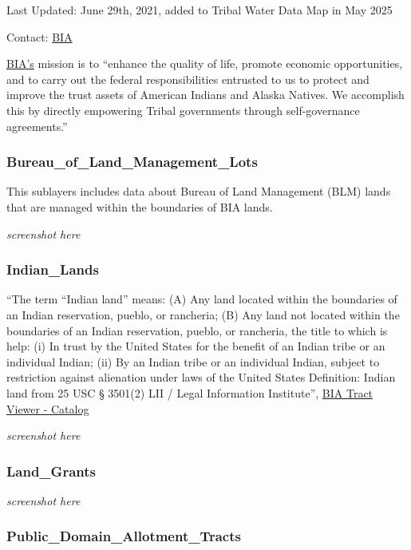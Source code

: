 \documentclass[
  letterpaper,
  DIV=11,
  numbers=noendperiod]{scrreprt}
\begin{document}
Last Updated: June 29th, 2021, added to Tribal Water Data Map in May
2025

Contact: \href{https://www.bia.gov/bia}{BIA}

\href{https://www.bia.gov/bia}{BIA's} mission is to ``enhance the
quality of life, promote economic opportunities, and to carry out the
federal responsibilities entrusted to us to protect and improve the
trust assets of American Indians and Alaska Natives. We accomplish this
by directly empowering Tribal governments through self-governance
agreements.''

\subsubsection{Bureau\_of\_Land\_Management\_Lots}\label{bureau_of_land_management_lots}

This sublayers includes data about Bureau of Land Management (BLM) lands
that are managed within the boundaries of BIA lands.

\emph{screenshot here}

\subsubsection{Indian\_Lands}\label{indian_lands}

``The term ``Indian land'' means: (A) Any land located within the
boundaries of an Indian reservation, pueblo, or rancheria; (B) Any land
not located within the boundaries of an Indian reservation, pueblo, or
rancheria, the title to which is help: (i) In trust by the United States
for the benefit of an Indian tribe or an individual Indian; (ii) By an
Indian tribe or an individual Indian, subject to restriction against
alienation under laws of the United States Definition: Indian land from
25 USC § 3501(2) \textbar{} LII / Legal Information Institute'',
\href{https://catalog.data.gov/dataset/bia-tract-viewer-ca86a}{BIA Tract
Viewer - Catalog}

\emph{screenshot here}

\subsubsection{Land\_Grants}\label{land_grants}

\emph{screenshot here}

\subsubsection{Public\_Domain\_Allotment\_Tracts}\label{public_domain_allotment_tracts}
\end{document}
